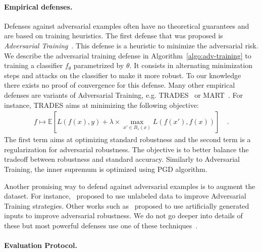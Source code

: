 \paragraph{Empirical defenses.} Defenses against adversarial examples often have no theoretical guarantees and are based on training heuristics. The first defense that was proposed is \emph{Adversarial Training}~\citep{goodfellow2014explaining,madry2018towards}. This defense is a heuristic to minimize the adversarial risk. We describe the adversarial training defense in Algorithm~\ref{algo:adv-training} to training a classifier $f_\theta$ parametrized by $\theta$. It consists in alternating minimization steps and attacks on the classifier to make it more robust. To our knowledge there exists no proof of convergence for this defense. Many other empirical defenses are variants of Adversarial Training, e.g. TRADES~\citep{zhang2019theoretically} or MART~\citep{wang2019improving}. For instance, TRADES aims at minimizing the following objective:
\begin{align*}
  f\mapsto\mathbb{E}\left[L(f(x),y)+\lambda\times\max_{x'\in B_\varepsilon(x)}L(f(x'),f(x))\right]\quad.
\end{align*}
The first term aims at optimizing standard robustness and the second term is a regularization for adversarial robustness. The objective is to better balance the tradeoff between robustness and standard accuracy. Similarly to Adversarial Training, the inner supremum is optimized using PGD algorithm.

Another promising way to defend against adversarial examples is to augment the dataset. For instance,~\cite{carmon2019unlabeled,rebuffi2021fixing} proposed to use unlabeled data to improve Adversarial Training strategies. Other works such  as~\citep{wang2019improving} proposed to use artificially generated inputs to improve adversarial robustness. We do not go deeper into details of these but most powerful defenses use one of these techniques~\citep{croce2020robustbench}.



\paragraph{Evaluation Protocol.}

